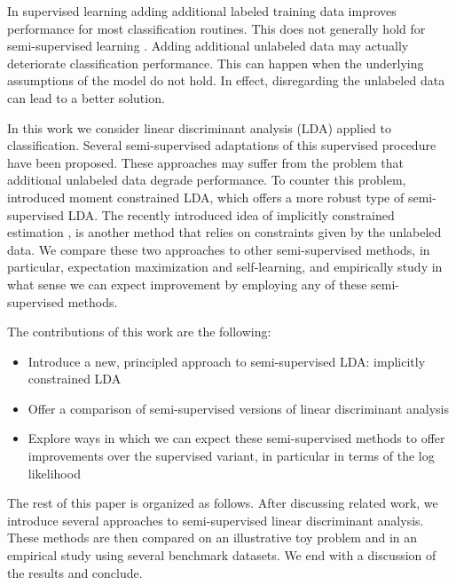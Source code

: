 \documentclass[10pt, a4paper, conference]{IEEEtran}
\begin{document}
In supervised learning adding additional labeled training data improves performance for most classification routines. This does not generally hold for semi-supervised learning \cite{Cozman2006}. Adding additional unlabeled data may actually deteriorate classification performance. This can happen when the underlying assumptions of the model do not hold. In effect, disregarding the unlabeled data can lead to a better solution.

In this work we consider linear discriminant analysis (LDA) applied to classification. Several semi-supervised adaptations of this supervised procedure have been proposed. These approaches may suffer from the problem that additional unlabeled data degrade performance. To counter this problem, \cite{Loog2014a} introduced moment constrained LDA, which offers a more robust type of semi-supervised LDA. The recently introduced idea of implicitly constrained estimation \cite{Krijthe2013}, is another method that relies on constraints given by the unlabeled data. We compare these two approaches to other semi-supervised methods, in particular, expectation maximization and self-learning, and empirically study in what sense we can expect improvement by employing any of these semi-supervised methods.

The contributions of this work are the following:

\begin{itemize}
  \item Introduce a new, principled approach to semi-supervised LDA: implicitly constrained LDA
  \item Offer a comparison of semi-supervised versions of linear discriminant analysis
  \item Explore ways in which we can expect these semi-supervised methods to offer improvements over the supervised variant, in particular in terms of the log likelihood
\end{itemize}

The rest of this paper is organized as follows. After discussing related work, we introduce several approaches to semi-supervised linear discriminant analysis. These methods are then compared on an illustrative toy problem and in an empirical study using several benchmark datasets. We end with a discussion of the results and conclude.
\end{document}

